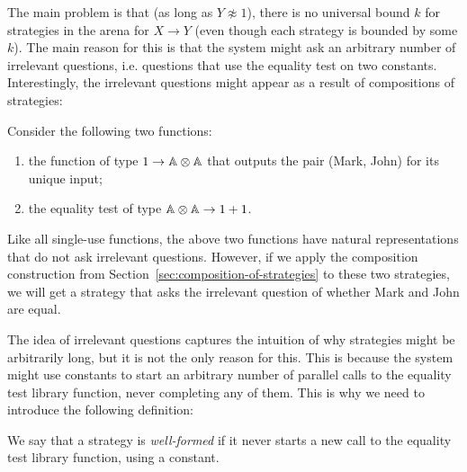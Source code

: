 The main problem is that (as long as $Y \not \approx 1$), there is no universal bound $k$ for strategies in the arena for $X \to Y$
(even though each strategy is bounded by some $k$). The main reason for this is that the system might ask an arbitrary number of irrelevant questions, 
i.e. questions that use the equality test on two constants. Interestingly, the irrelevant questions might appear as a result of compositions of strategies:
\begin{example}\label{ex:irrelevant-questions-from-composition}
    Consider the  following two functions: 
    \begin{enumerate}
        \item the function of type  $1 \to \mathbb A \otimes \mathbb A$ that outputs the pair (Mark, John) for its unique input;
        \item the equality test of type $\mathbb A \otimes \mathbb A \to 1 + 1$.
    \end{enumerate}
    Like all single-use functions, the above two functions have natural representations that do not ask irrelevant questions.
    However, if we apply the composition construction from Section~\ref{sec:composition-of-strategies} to these two strategies, we will get a strategy that asks the irrelevant question of whether Mark and John are equal. \exampleend
\end{example}

The idea of irrelevant questions captures the intuition of why strategies might be arbitrarily long, but it is not the only reason for this.
This is because the system might use constants to start an arbitrary number of parallel calls to the equality test library function, 
never completing any of them. This is why we need to introduce the following definition:
\begin{definition}
    We say that a strategy is \emph{well-formed} if it never starts a new call to the equality test library function, using a constant. 
\end{definition}

